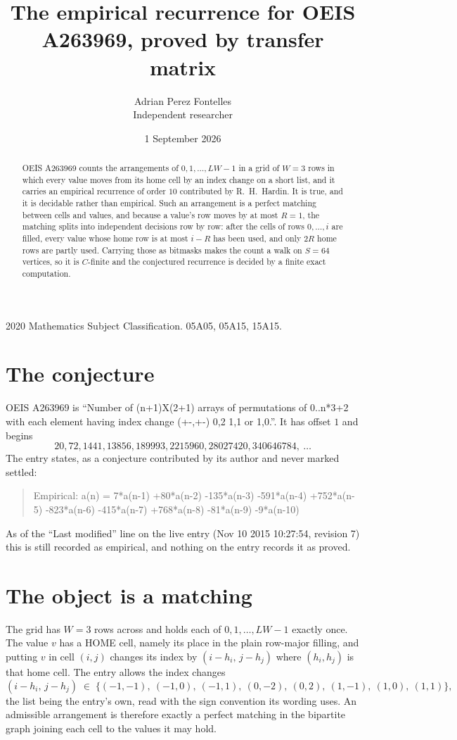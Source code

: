 \documentclass[11pt,a4paper]{article}
\title{The empirical recurrence for OEIS A263969, proved by transfer matrix}
\author{Adrian Perez Fontelles\\ \small Independent researcher}
\date{1 September 2026}
\theoremstyle{plain}
\theoremstyle{definition}
\begin{document}
\maketitle

\begin{abstract}
OEIS A263969 counts the arrangements of $0,1,\dots,LW-1$ in a grid of $W=3$ rows in which
every value moves from its home cell by an index change on a short list, and it carries an
empirical recurrence of order $10$ contributed by R.~H.~Hardin. It is true, and it is
decidable rather than empirical. Such an arrangement is a perfect matching between cells and
values, and because a value's row moves by at most $R=1$, the matching splits into
independent decisions row by row: after the cells of rows $0,\dots,i$ are filled,
every value whose home row is at most $i-R$ has been used, and only $2R$ home rows are
partly used. Carrying those as bitmasks makes the count a walk on $S=64$ vertices, so it is
$C$-finite and the conjectured recurrence is decided by a finite exact computation.
\end{abstract}

\noindent\small 2020 Mathematics Subject Classification. 05A05, 05A15, 15A15.\normalsize

\section{The conjecture}

OEIS A263969 is ``Number of (n+1)X(2+1) arrays of permutations of 0..n*3+2 with each element having index change (+-,+-) 0,2 1,1 or 1,0.''. It has offset $1$ and begins
\[
20, 72, 1441, 13856, 189993, 2215960, 28027420, 340646784,\ \dots
\]
The entry states, as a conjecture contributed by its author and never marked settled:
\begin{quote}
Empirical: a(n) = 7*a(n-1) +80*a(n-2) -135*a(n-3) -591*a(n-4) +752*a(n-5) -823*a(n-6) -415*a(n-7) +768*a(n-8) -81*a(n-9) -9*a(n-10)
\end{quote}
As of the ``Last modified'' line on the live entry (Nov 10 2015 10:27:54, revision 7) this is still
recorded as empirical, and nothing on the entry records it as proved.

\section{The object is a matching}

The grid has $W=3$ rows across and holds each of $0,1,\dots,LW-1$ exactly once. The value
$v$ has a HOME cell, namely its place in the plain row-major filling, and putting $v$ in cell
$(i,j)$ changes its index by $(i-h_i,\,j-h_j)$ where $(h_i,h_j)$ is that home cell. The entry
allows the index changes
\[
(i-h_i,\,j-h_j)\;\in\;\{(-1,-1),\ (-1,0),\ (-1,1),\ (0,-2),\ (0,2),\ (1,-1),\ (1,0),\ (1,1)\},
\]
the list being the entry's own, read with the sign convention its wording uses. An admissible
arrangement is therefore exactly a perfect matching in the bipartite graph joining each cell to
the values it may hold.
\end{document}
